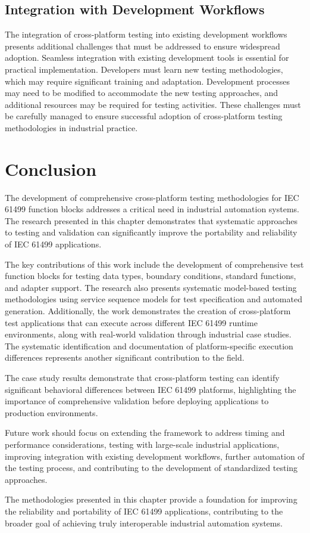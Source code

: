 \subsection{Integration with Development Workflows}

The integration of cross-platform testing into existing development workflows presents additional challenges that must be addressed to ensure widespread adoption. Seamless integration with existing development tools is essential for practical implementation. Developers must learn new testing methodologies, which may require significant training and adaptation. Development processes may need to be modified to accommodate the new testing approaches, and additional resources may be required for testing activities. These challenges must be carefully managed to ensure successful adoption of cross-platform testing methodologies in industrial practice.

\section{Conclusion}

The development of comprehensive cross-platform testing methodologies for IEC 61499 function blocks addresses a critical need in industrial automation systems. The research presented in this chapter demonstrates that systematic approaches to testing and validation can significantly improve the portability and reliability of IEC 61499 applications.

The key contributions of this work include the development of comprehensive test function blocks for testing data types, boundary conditions, standard functions, and adapter support. The research also presents systematic model-based testing methodologies using service sequence models for test specification and automated generation. Additionally, the work demonstrates the creation of cross-platform test applications that can execute across different IEC 61499 runtime environments, along with real-world validation through industrial case studies. The systematic identification and documentation of platform-specific execution differences represents another significant contribution to the field.

The case study results demonstrate that cross-platform testing can identify significant behavioral differences between IEC 61499 platforms, highlighting the importance of comprehensive validation before deploying applications to production environments.

Future work should focus on extending the framework to address timing and performance considerations, testing with large-scale industrial applications, improving integration with existing development workflows, further automation of the testing process, and contributing to the development of standardized testing approaches.

The methodologies presented in this chapter provide a foundation for improving the reliability and portability of IEC 61499 applications, contributing to the broader goal of achieving truly interoperable industrial automation systems.
